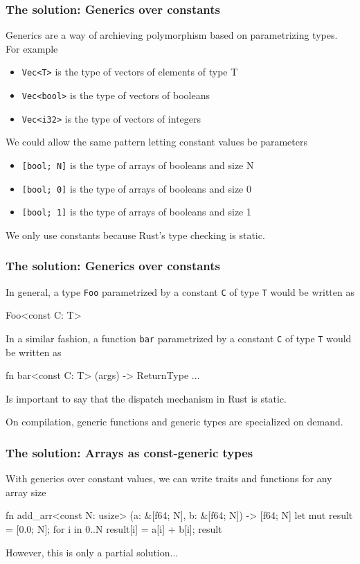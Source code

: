 \documentclass{beamer}
\newcommand{\code}[1] {\texttt{\footnotesize #1}}
\begin{document}
\begin{frame}[fragile]
    \frametitle{The solution: Generics over constants}
    Generics are a way of archieving polymorphism based on parametrizing types. For example
    \begin{itemize}
        \item \code{Vec<T>} is the type of vectors of elements of type T
        \item \code{Vec<bool>} is the type of vectors of booleans
        \item \code{Vec<i32>} is the type of vectors of integers
    \end{itemize}
    We could allow the same pattern letting constant values be parameters
    \begin{itemize}
        \item \code{[bool; N]} is the type of arrays of booleans and size N 
        \item \code{[bool; 0]} is the type of arrays of booleans and size 0 
        \item \code{[bool; 1]} is the type of arrays of booleans and size 1
    \end{itemize}
    We only use constants because Rust's type checking is static.
\end{frame}

\begin{frame}[fragile]
    \frametitle{The solution: Generics over constants}
    In general, a type \code{Foo} parametrized by a constant \code{C} of type \code{T} would be written as
    \begin{rustcode}
        Foo<const C: T>
    \end{rustcode}
    In a similar fashion, a function \code{bar} parametrized by a constant \code{C} of type \code{T} would be written as
    \begin{rustcode}
        fn bar<const C: T> (args) -> ReturnType { ... }
    \end{rustcode}
    Is important to say that the dispatch mechanism in Rust is static. 
    
    On compilation, generic functions and generic types are specialized on demand.
\end{frame}

\begin{frame}[fragile]
    \frametitle{The solution: Arrays as const-generic types}
    With generics over constant values, we can write traits and functions for any array size
    \begin{rustcode}
    fn add_arr<const N: usize> (a: &[f64; N], b: &[f64; N]) 
    -> [f64; N] {
            let mut result = [0.0; N];
        for i in 0..N {
            result[i] = a[i] + b[i];
        }
        result
    }
    \end{rustcode}
    However, this is only a partial solution...
\end{frame}
\end{document}
